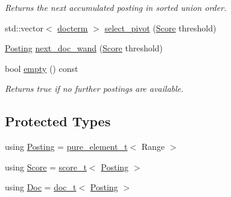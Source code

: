 \begin{DoxyCompactItemize}
\begin{DoxyCompactList}\small\item\em Returns the next {\itshape accumulated posting} in sorted union order. \end{DoxyCompactList}\item 
std\+::vector$<$ \mbox{\hyperlink{structirkit_1_1UnionRange_1_1docterm}{docterm}} $>$ \mbox{\hyperlink{classirkit_1_1UnionRange_aacb1050fb1d624260c4013f4ba1939a6}{select\+\_\+pivot}} (\mbox{\hyperlink{classirkit_1_1UnionRange_a47fb098a85581f5e33f4203e16245dae}{Score}} threshold)
\item 
\mbox{\hyperlink{classirkit_1_1UnionRange_a5f694970419f5a60d7fd41d740556229}{Posting}} \mbox{\hyperlink{classirkit_1_1UnionRange_a6f6bf3aa9d7d273371a9477b88c54737}{next\+\_\+doc\+\_\+wand}} (\mbox{\hyperlink{classirkit_1_1UnionRange_a47fb098a85581f5e33f4203e16245dae}{Score}} threshold)
\item 
bool \mbox{\hyperlink{classirkit_1_1UnionRange_af12b028d791c9d9821c17ae30084fa86}{empty}} () const
\begin{DoxyCompactList}\small\item\em Returns true if no further postings are available. \end{DoxyCompactList}\end{DoxyCompactItemize}
\subsection*{Protected Types}
\begin{DoxyCompactItemize}
\item 
using \mbox{\hyperlink{classirkit_1_1UnionRange_a5f694970419f5a60d7fd41d740556229}{Posting}} = \mbox{\hyperlink{namespaceirkit_afcffab67300c5c703cb38a363c9a6f1d}{pure\+\_\+element\+\_\+t}}$<$ Range $>$
\item 
using \mbox{\hyperlink{classirkit_1_1UnionRange_a47fb098a85581f5e33f4203e16245dae}{Score}} = \mbox{\hyperlink{namespaceirkit_a754dabe3346f950c948e7596d9d46c71}{score\+\_\+t}}$<$ \mbox{\hyperlink{classirkit_1_1UnionRange_a5f694970419f5a60d7fd41d740556229}{Posting}} $>$
\item 
using \mbox{\hyperlink{classirkit_1_1UnionRange_a387589b1f09868b60485c4ab8c61f97a}{Doc}} = \mbox{\hyperlink{namespaceirkit_a595d83053e112c98ab2a1b65e5dd74be}{doc\+\_\+t}}$<$ \mbox{\hyperlink{classirkit_1_1UnionRange_a5f694970419f5a60d7fd41d740556229}{Posting}} $>$
\end{DoxyCompactItemize}
